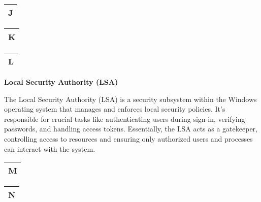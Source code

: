 \begin{table}
\justifying

\begin{tabular}{l}
\textbf{J} \\
\hline

\end{tabular}

\end{table}

\begin{table}
\justifying

\begin{tabular}{l}
\textbf{K} \\
\hline

\end{tabular}

\end{table}

\begin{table}
\justifying

\begin{tabular}{l}
\textbf{L} \\
\hline

\end{tabular}

\end{table}

\textbf{Local Security Authority (LSA)}

The Local Security Authority (LSA) is a security subsystem within the Windows operating system that manages and enforces local security policies. It's responsible for crucial tasks like authenticating users during sign-in, verifying passwords, and handling access tokens. Essentially, the LSA acts as a gatekeeper, controlling access to resources and ensuring only authorized users and processes can interact with the system. 

\begin{table}
\justifying

\begin{tabular}{l}
\textbf{M} \\
\hline

\end{tabular}

\end{table}

\begin{table}
\justifying

\begin{tabular}{l}
\textbf{N} \\
\hline

\end{tabular}

\end{table}

